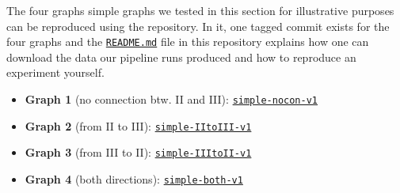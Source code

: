\begin{tcolorbox}[title=\faIcon{recycle} Reproducibility, parbox=false]
    The four graphs simple graphs we tested in this section for illustrative purposes can be reproduced using the  repository. In it, one tagged commit exists for the four graphs and the \href{https://github.com/rmnldwg/lynference#readme}{ \texttt{README.md}} file in this repository explains how one can download the data our pipeline runs produced and how to reproduce an experiment yourself.

    \begin{itemize}
        \item \textbf{Graph 1} (no connection btw. II and III): \href{https://github.com/rmnldwg/lynference/releases/tag/simple-nocon-v1}{ \texttt{simple-nocon-v1}}
        \item \textbf{Graph 2} (from II to III): \href{https://github.com/rmnldwg/lynference/releases/tag/simple-IItoIII-v1}{ \texttt{simple-IItoIII-v1}}
        \item \textbf{Graph 3} (from III to II): \href{https://github.com/rmnldwg/lynference/releases/tag/simple-IIItoII-v1}{ \texttt{simple-IIItoII-v1}}
        \item \textbf{Graph 4} (both directions): \href{https://github.com/rmnldwg/lynference/releases/tag/simple-both-v1}{ \texttt{simple-both-v1}}
    \end{itemize}
\end{tcolorbox}
